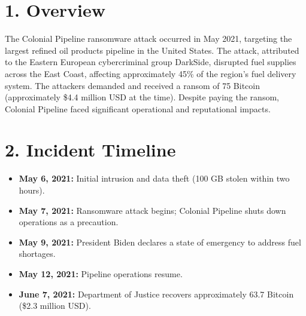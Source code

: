 \documentclass[11pt]{article}
\begin{document}
\tableofcontents
\thispagestyle{empty}
\clearpage

\setcounter{page}{1}

\section*{1. Overview}
The Colonial Pipeline ransomware attack occurred in May 2021, targeting the largest refined oil products pipeline in the United States. The attack, attributed to the Eastern European cybercriminal group DarkSide, disrupted fuel supplies across the East Coast, affecting approximately 45\% of the region's fuel delivery system. The attackers demanded and received a ransom of 75 Bitcoin (approximately \$4.4 million USD at the time). Despite paying the ransom, Colonial Pipeline faced significant operational and reputational impacts.

\section*{2. Incident Timeline}
\begin{itemize}[leftmargin=*]
    \item \textbf{May 6, 2021:} Initial intrusion and data theft (100 GB stolen within two hours).
    \item \textbf{May 7, 2021:} Ransomware attack begins; Colonial Pipeline shuts down operations as a precaution.
    \item \textbf{May 9, 2021:} President Biden declares a state of emergency to address fuel shortages.
    \item \textbf{May 12, 2021:} Pipeline operations resume.
    \item \textbf{June 7, 2021:} Department of Justice recovers approximately 63.7 Bitcoin (\$2.3 million USD).
\end{itemize}
\end{document}
